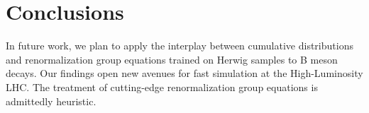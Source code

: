 \section{Conclusions}\label{sec:conclusions}

In future work, we plan to apply the interplay between cumulative
distributions and renormalization group equations trained on Herwig
samples to B meson decays. Our findings open new avenues for fast
simulation at the High-Luminosity LHC. The treatment of cutting-edge
renormalization group equations is admittedly heuristic.

